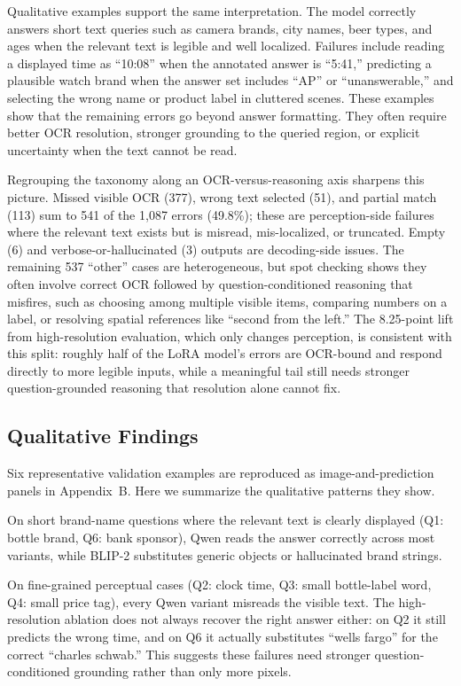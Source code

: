 \documentclass[11pt]{article}
\begin{document}
Qualitative examples support the same interpretation. The model correctly answers short text queries such as camera brands, city names, beer types, and ages when the relevant text is legible and well localized. Failures include reading a displayed time as ``10:08'' when the annotated answer is ``5:41,'' predicting a plausible watch brand when the answer set includes ``AP'' or ``unanswerable,'' and selecting the wrong name or product label in cluttered scenes. These examples show that the remaining errors go beyond answer formatting. They often require better OCR resolution, stronger grounding to the queried region, or explicit uncertainty when the text cannot be read.

Regrouping the taxonomy along an OCR-versus-reasoning axis sharpens this picture. Missed visible OCR (377), wrong text selected (51), and partial match (113) sum to 541 of the 1{,}087 errors (49.8\%); these are perception-side failures where the relevant text exists but is misread, mis-localized, or truncated. Empty (6) and verbose-or-hallucinated (3) outputs are decoding-side issues. The remaining 537 ``other'' cases are heterogeneous, but spot checking shows they often involve correct OCR followed by question-conditioned reasoning that misfires, such as choosing among multiple visible items, comparing numbers on a label, or resolving spatial references like ``second from the left.'' The 8.25-point lift from high-resolution evaluation, which only changes perception, is consistent with this split: roughly half of the LoRA model's errors are OCR-bound and respond directly to more legible inputs, while a meaningful tail still needs stronger question-grounded reasoning that resolution alone cannot fix.

\subsection{Qualitative Findings}

Six representative validation examples are reproduced as image-and-prediction panels in Appendix~B. Here we summarize the qualitative patterns they show.

On short brand-name questions where the relevant text is clearly displayed (Q1: bottle brand, Q6: bank sponsor), Qwen reads the answer correctly across most variants, while BLIP-2 substitutes generic objects or hallucinated brand strings.

On fine-grained perceptual cases (Q2: clock time, Q3: small bottle-label word, Q4: small price tag), every Qwen variant misreads the visible text. The high-resolution ablation does not always recover the right answer either: on Q2 it still predicts the wrong time, and on Q6 it actually substitutes ``wells fargo'' for the correct ``charles schwab.'' This suggests these failures need stronger question-conditioned grounding rather than only more pixels.
\end{document}
